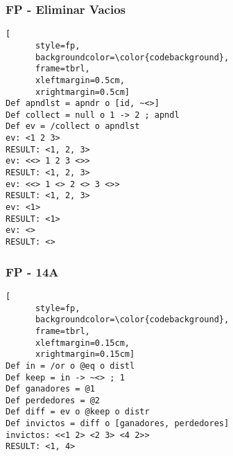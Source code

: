 \documentclass{beamer}
\begin{document}
\begin{frame}[fragile]
  \frametitle{FP - Eliminar Vacios}

  \begin{center}


    \begin{lstlisting}[
      style=fp,
      backgroundcolor=\color{codebackground},
      frame=tbrl,
      xleftmargin=0.5cm,
      xrightmargin=0.5cm]
Def apndlst = apndr o [id, ~<>]
Def collect = null o 1 -> 2 ; apndl
Def ev = /collect o apndlst
ev: <1 2 3>
RESULT: <1, 2, 3>
ev: <<> 1 2 3 <>>
RESULT: <1, 2, 3>
ev: <<> 1 <> 2 <> 3 <>>
RESULT: <1, 2, 3>
ev: <1>
RESULT: <1>
ev: <>
RESULT: <>
    \end{lstlisting}
  \end{center}
\end{frame}

\begin{frame}[fragile]
  \frametitle{FP - 14A}

  \begin{center}


    \begin{lstlisting}[
      style=fp,
      backgroundcolor=\color{codebackground},
      frame=tbrl,
      xleftmargin=0.15cm,
      xrightmargin=0.15cm]
Def in = /or o @eq o distl
Def keep = in -> ~<> ; 1
Def ganadores = @1
Def perdedores = @2
Def diff = ev o @keep o distr
Def invictos = diff o [ganadores, perdedores]
invictos: <<1 2> <2 3> <4 2>>
RESULT: <1, 4>
    \end{lstlisting}
  \end{center}
\end{frame}
\end{document}
